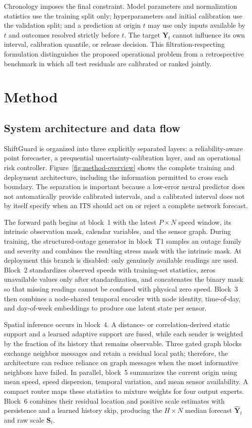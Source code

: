 \documentclass[pdflatex,sn-mathphys-num]{sn-jnl}
\begin{document}
Chronology imposes the final constraint. Model parameters and normalization
statistics use the training split only; hyperparameters and initial calibration
use the validation split; and a prediction at origin $t$ may use only inputs
available by $t$ and outcomes resolved strictly before $t$. The target
$\mathbf{Y}_t$ cannot influence its own interval, calibration quantile, or
release decision. This filtration-respecting formulation distinguishes the
proposed operational problem from a retrospective benchmark in which all test
residuals are calibrated or ranked jointly.

\section{Method}
\subsection{System architecture and data flow}
ShiftGuard is organized into three explicitly separated layers: a
reliability-aware point forecaster, a prequential uncertainty-calibration
layer, and an operational risk controller. Figure~\ref{fig:method-overview}
shows the complete training and deployment architecture, including the
information permitted to cross each boundary. The separation is important
because a low-error neural predictor does not automatically provide calibrated
intervals, and a calibrated interval does not by itself specify when an ITS
should act on or reject a complete network forecast.

The forward path begins at block~1 with the latest $P\times N$ speed window,
its intrinsic observation mask, calendar variables, and the sensor graph.
During training, the structured-outage generator in block~T1 samples an outage
family and severity and combines the resulting stress mask with the intrinsic
mask. At deployment this branch is disabled: only genuinely available readings
are used. Block~2 standardizes observed speeds with training-set statistics,
zeros unavailable values only after standardization, and concatenates the
binary mask so that missing readings cannot be confused with physical zero
speed. Block~3 then combines a node-shared temporal encoder with node identity,
time-of-day, and day-of-week embeddings to produce one latent state per sensor.

Spatial inference occurs in block~4. A distance- or correlation-derived static
support and a learned adaptive support are fused, while each sender is weighted
by the fraction of its history that remains observable. Three gated graph
blocks exchange neighbor messages and retain a residual local path; therefore,
the architecture can reduce reliance on graph messages when the most
informative neighbors have failed. In parallel, block~5 summarizes the current
origin using mean speed, speed dispersion, temporal variation, and mean sensor
availability. A compact router maps these statistics to mixture weights for
four output experts. Block~6 combines their residual location and positive
scale estimates with persistence and a learned history skip, producing the
$H\times N$ median forecast $\widehat{\mathbf{Y}}_t$ and raw scale
$\mathbf{S}_t$.
\end{document}
